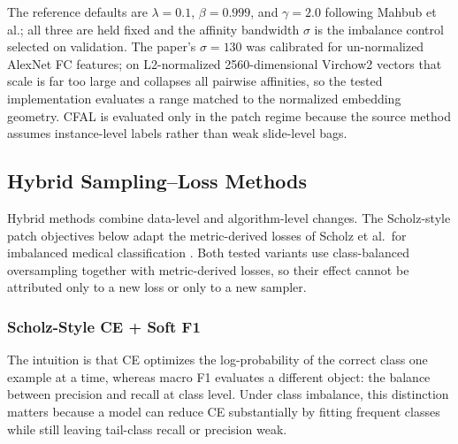 \documentclass[11pt]{article}
\begin{document}
The reference defaults are $\lambda=\num{0.1}$, $\beta=\num{0.999}$, and $\gamma=\num{2.0}$ following Mahbub et al.; all three are held fixed and the affinity bandwidth $\sigma$ is the imbalance control selected on validation. The paper's $\sigma=\num{130}$ was calibrated for un-normalized AlexNet FC features; on L2-normalized \num{2560}-dimensional Virchow2 vectors that scale is far too large and collapses all pairwise affinities, so the tested implementation evaluates a range matched to the normalized embedding geometry. CFAL is evaluated only in the patch regime because the source method assumes instance-level labels rather than weak slide-level bags.

\subsection{Hybrid Sampling--Loss Methods}
Hybrid methods combine data-level and algorithm-level changes. The Scholz-style patch objectives below adapt the metric-derived losses of Scholz et al.\ for imbalanced medical classification \citep{scholz2024imbalanceAware}. Both tested variants use class-balanced oversampling together with metric-derived losses, so their effect cannot be attributed only to a new loss or only to a new sampler.

\subsubsection{Scholz-Style CE + Soft F1}
The intuition is that CE optimizes the log-probability of the correct class one example at a time, whereas macro F1 evaluates a different object: the balance between precision and recall at class level. Under class imbalance, this distinction matters because a model can reduce CE substantially by fitting frequent classes while still leaving tail-class recall or precision weak.
\end{document}
